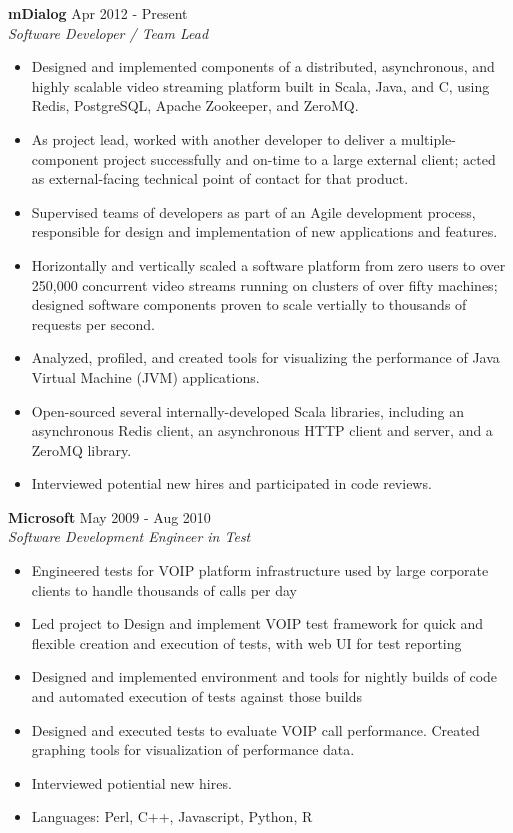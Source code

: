 \documentclass[line,margin]{res}
\begin{document}
\begin{resume}
    {\bf mDialog} \hfill Apr 2012 - Present \\
    {\sl Software Developer / Team Lead}
                 \begin{itemize}  \itemsep -2pt %
                 \item Designed and implemented components of a distributed, asynchronous, and highly scalable video streaming platform built in Scala, Java, and C, using Redis, PostgreSQL, Apache Zookeeper, and ZeroMQ.\item As project lead, worked with another developer to deliver a multiple-component project successfully and on-time to a large external client; acted as external-facing technical point of contact for that product.\item Supervised teams of developers as part of an Agile development process, responsible for design and implementation of new applications and features.\item Horizontally and vertically scaled a software platform from zero users to over 250,000 concurrent video streams running on clusters of over fifty machines; designed software components proven to scale vertially to thousands of requests per second.\item Analyzed, profiled, and created tools for visualizing the performance of Java Virtual Machine (JVM) applications.\item Open-sourced several internally-developed Scala libraries, including an asynchronous Redis client, an asynchronous HTTP client and server, and a ZeroMQ library.\item Interviewed potential new hires and participated in code reviews.
                \end{itemize}
  
    {\bf Microsoft} \hfill May 2009 - Aug 2010 \\
    {\sl Software Development Engineer in Test}
                 \begin{itemize}  \itemsep -2pt %
                 \item Engineered tests for VOIP platform infrastructure used by large corporate clients to handle thousands of calls per day\item Led project to Design and implement VOIP test framework for quick and flexible creation and execution of tests, with web UI for test reporting\item Designed and implemented environment and tools for nightly builds of code and automated execution of tests against those builds\item Designed and executed tests to evaluate VOIP call performance. Created graphing tools for visualization of performance data.\item Interviewed potiential new hires.\item Languages: Perl, C++, Javascript, Python, R
                \end{itemize}
  

\end{resume}
\end{document}
